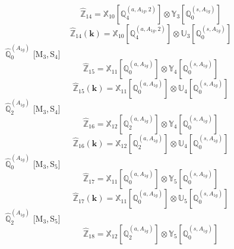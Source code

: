 \documentclass[fleqn,10pt,landscape]{article}
\begin{document}
\begin{itemize}
\begin{dmath*}
\hat{\mathbb{Z}}_{14}=\mathbb{X}_{10}[\mathbb{Q}_{4}^{(a,A_{1g},2)}] \otimes\mathbb{Y}_{3}[\mathbb{Q}_{0}^{(s,A_{1g})}]
\end{dmath*}
\begin{dmath*}
\hat{\mathbb{Z}}_{14}(\bm{k})=\mathbb{X}_{10}[\mathbb{Q}_{4}^{(a,A_{1g},2)}] \otimes\mathbb{U}_{3}[\mathbb{Q}_{0}^{(s,A_{1g})}]
\end{dmath*}
\vspace{4mm}
\noindent {} $\,\,\,\hat{\mathbb{Q}}_{0}^{(A_{1g})}$ [M$_{3}$,\,S$_{4}$]
\begin{dmath*}
\hat{\mathbb{Z}}_{15}=\mathbb{X}_{11}[\mathbb{Q}_{0}^{(a,A_{1g})}] \otimes\mathbb{Y}_{4}[\mathbb{Q}_{0}^{(s,A_{1g})}]
\end{dmath*}
\begin{dmath*}
\hat{\mathbb{Z}}_{15}(\bm{k})=\mathbb{X}_{11}[\mathbb{Q}_{0}^{(a,A_{1g})}] \otimes\mathbb{U}_{4}[\mathbb{Q}_{0}^{(s,A_{1g})}]
\end{dmath*}
\vspace{4mm}
\noindent {} $\,\,\,\hat{\mathbb{Q}}_{2}^{(A_{1g})}$ [M$_{3}$,\,S$_{4}$]
\begin{dmath*}
\hat{\mathbb{Z}}_{16}=\mathbb{X}_{12}[\mathbb{Q}_{2}^{(a,A_{1g})}] \otimes\mathbb{Y}_{4}[\mathbb{Q}_{0}^{(s,A_{1g})}]
\end{dmath*}
\begin{dmath*}
\hat{\mathbb{Z}}_{16}(\bm{k})=\mathbb{X}_{12}[\mathbb{Q}_{2}^{(a,A_{1g})}] \otimes\mathbb{U}_{4}[\mathbb{Q}_{0}^{(s,A_{1g})}]
\end{dmath*}
\vspace{4mm}
\noindent {} $\,\,\,\hat{\mathbb{Q}}_{0}^{(A_{1g})}$ [M$_{3}$,\,S$_{5}$]
\begin{dmath*}
\hat{\mathbb{Z}}_{17}=\mathbb{X}_{11}[\mathbb{Q}_{0}^{(a,A_{1g})}] \otimes\mathbb{Y}_{5}[\mathbb{Q}_{0}^{(s,A_{1g})}]
\end{dmath*}
\begin{dmath*}
\hat{\mathbb{Z}}_{17}(\bm{k})=\mathbb{X}_{11}[\mathbb{Q}_{0}^{(a,A_{1g})}] \otimes\mathbb{U}_{5}[\mathbb{Q}_{0}^{(s,A_{1g})}]
\end{dmath*}
\vspace{4mm}
\noindent {} $\,\,\,\hat{\mathbb{Q}}_{2}^{(A_{1g})}$ [M$_{3}$,\,S$_{5}$]
\begin{dmath*}
\hat{\mathbb{Z}}_{18}=\mathbb{X}_{12}[\mathbb{Q}_{2}^{(a,A_{1g})}] \otimes\mathbb{Y}_{5}[\mathbb{Q}_{0}^{(s,A_{1g})}]
\end{dmath*}
\begin{dmath*}

\end{dmath*}
\end{itemize}
\end{document}
